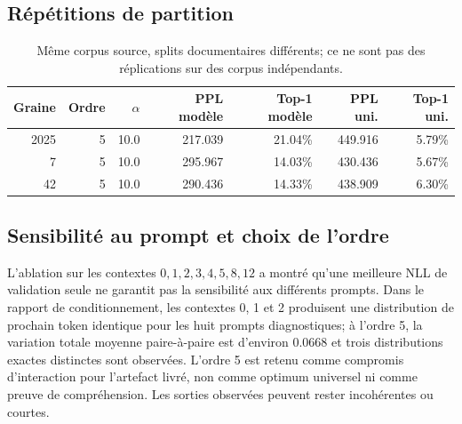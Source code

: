 \documentclass[11pt,a4paper]{article}
\begin{document}
\subsection{Répétitions de partition}
\begin{table}[h!]\centering\begin{tabular}{rrrrrrr}\toprule Graine & Ordre & $\alpha$ & PPL modèle & Top-1 modèle & PPL uni. & Top-1 uni. \\
\midrule
2025 & 5 & 10.0 & 217.039 & 21.04\% & 449.916 & 5.79\% \\
7 & 5 & 10.0 & 295.967 & 14.03\% & 430.436 & 5.67\% \\
42 & 5 & 10.0 & 290.436 & 14.33\% & 438.909 & 6.30\% \\
\bottomrule\end{tabular}\caption{Même corpus source, splits documentaires différents; ce ne sont pas des réplications sur des corpus indépendants.}\end{table}
\subsection{Sensibilité au prompt et choix de l'ordre}
L'ablation sur les contextes $0,1,2,3,4,5,8,12$ a montré qu'une meilleure NLL de validation seule ne garantit pas la sensibilité aux différents prompts. Dans le rapport de conditionnement, les contextes 0, 1 et 2 produisent une distribution de prochain token identique pour les huit prompts diagnostiques; à l'ordre 5, la variation totale moyenne paire-à-paire est d'environ 0.0668 et trois distributions exactes distinctes sont observées. L'ordre 5 est retenu comme compromis d'interaction pour l'artefact livré, non comme optimum universel ni comme preuve de compréhension. Les sorties observées peuvent rester incohérentes ou courtes.
\end{document}
